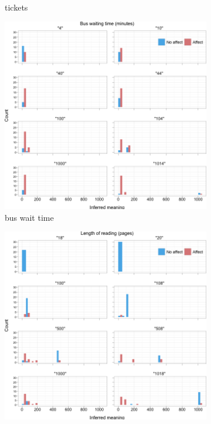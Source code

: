 \documentclass{article} %
\begin{document}
\begin{figure}[t]
\begin{subfigure}[b]{0.5\textwidth}
		\caption{tickets}
	\end{subfigure}
	\begin{subfigure}[b]{0.33\textwidth}
                \centering
                \includegraphics[width=\textwidth]{humans_all_bus.png}
		\caption{bus wait time}
	\end{subfigure}
	\begin{subfigure}[b]{0.33\textwidth}
                \centering
                \includegraphics[width=\textwidth]{humans_all_reading.png}

\end{subfigure}
\end{figure}
\end{document}
